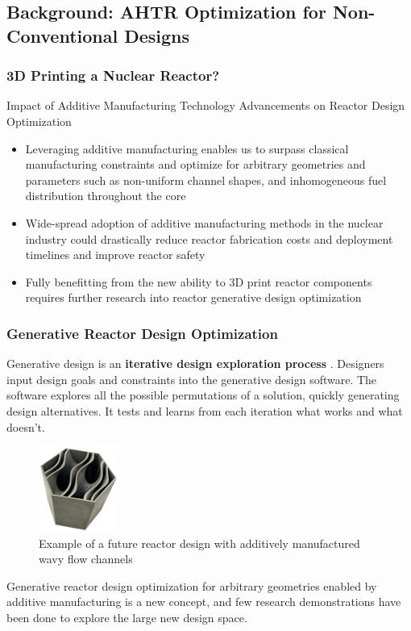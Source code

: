 \subsection{Background: AHTR Optimization for Non-Conventional Designs}
\begin{frame}
    \frametitle{3D Printing a Nuclear Reactor?}
    \begin{block}{Impact of Additive Manufacturing Technology Advancements on 
        Reactor Design Optimization}
        \begin{itemize}
            \item Leveraging additive manufacturing enables us to surpass classical 
            manufacturing constraints and optimize for arbitrary geometries and parameters 
            such as non-uniform channel shapes, and inhomogeneous fuel distribution 
            throughout the core
            \item Wide-spread adoption of additive manufacturing methods in the nuclear industry 
            could drastically reduce reactor fabrication costs and deployment timelines 
            and improve reactor safety
            \item Fully benefitting from the new ability to 3D print reactor components 
            requires further research into reactor generative design optimization
          \end{itemize}
    \end{block}
  \end{frame}

  \begin{frame}
    \frametitle{Generative Reactor Design Optimization}
    Generative design is an \textbf{iterative design exploration process} \cite{autodesk_autodesk_2020}. 
    Designers input design goals and constraints into the generative design software. 
    The software explores all the possible permutations of a solution, quickly generating 
    design alternatives. 
    It tests and learns from each iteration what works and what doesn't.

    \begin{figure}[]
        \includegraphics[width=0.2\linewidth]{figures/wavy-channels.png}
        \caption{Example of a future reactor design with additively manufactured wavy 
        flow channels}
    \end{figure}
    
    Generative reactor design optimization for arbitrary geometries enabled by additive 
    manufacturing is a new concept, and few research demonstrations have been done to 
    explore the large new design space.

  \end{frame}

